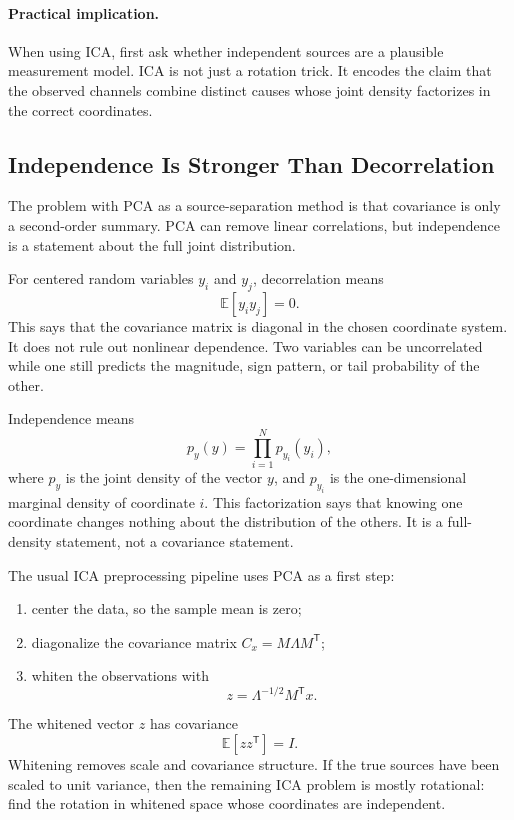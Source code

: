 \paragraph{Practical implication.}
When using ICA, first ask whether independent sources are a plausible measurement model. ICA is not just a rotation trick. It encodes the claim that the observed channels combine distinct causes whose joint density factorizes in the correct coordinates.

\subsection{Independence Is Stronger Than Decorrelation}

The problem with PCA as a source-separation method is that covariance is only a second-order summary. PCA can remove linear correlations, but independence is a statement about the full joint distribution.

For centered random variables \(y_i\) and \(y_j\), decorrelation means
\[
  \mathbb{E}[y_i y_j]=0.
\]
This says that the covariance matrix is diagonal in the chosen coordinate system. It does not rule out nonlinear dependence. Two variables can be uncorrelated while one still predicts the magnitude, sign pattern, or tail probability of the other.

Independence means
\[
  p_y(y)
  =
  \prod_{i=1}^{N}p_{y_i}(y_i),
\]
where \(p_y\) is the joint density of the vector \(y\), and \(p_{y_i}\) is the one-dimensional marginal density of coordinate \(i\). This factorization says that knowing one coordinate changes nothing about the distribution of the others. It is a full-density statement, not a covariance statement.

The usual ICA preprocessing pipeline uses PCA as a first step:
\begin{enumerate}
  \item center the data, so the sample mean is zero;
  \item diagonalize the covariance matrix \(C_x=M\Lambda M^{\mathsf{T}}\);
  \item whiten the observations with
  \[
    z=\Lambda^{-1/2}M^{\mathsf{T}}x.
  \]
\end{enumerate}
The whitened vector \(z\) has covariance
\[
  \mathbb{E}[zz^{\mathsf{T}}]=I.
\]
Whitening removes scale and covariance structure. If the true sources have been scaled to unit variance, then the remaining ICA problem is mostly rotational: find the rotation in whitened space whose coordinates are independent.


